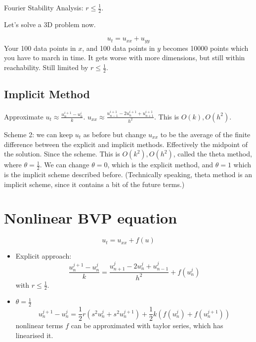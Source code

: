 \documentclass{article}
\numberwithin{equation}{section}
\theoremstyle{definition}
\begin{document}
Fourier Stability Analysis: $r \leq \frac12$.

Let's solve a 3D problem now.

\begin{equation}
    u_t = u_{xx} + u_{yy}
\end{equation}
Your 100 data points in $x$, and 100 data points in $y$ becomes 10000 points which you have to march in time. It gets worse with more dimensions, but still within reachability. Still limited by $r \le \frac 12$.

\subsection{Implicit Method}
Approximate $u_t \approx \frac{u_n^{i+1} - u_n^i}{k}$. $u_{xx} \approx \frac{u_{n-1}^{i+1} - 2u_n^{i+1} + u_{n+1}^{i+1}}{h^2}$. This is $O(k), O(h^2)$.

Scheme 2: we can keep $u_t$ as before but change $u_{xx}$ to be the average of the finite difference between the explicit and implicit methods. Effectively the midpoint of the solution. Since the scheme. This is $O(k^2), O(h^2)$, called the theta method, where $\theta = \frac 12$. We can change $\theta=0$, which is the explicit method, and $\theta = 1$ which is the implicit scheme described before. (Technically speaking, theta method is an implicit scheme, since it contains a bit of the future terms.)

\section{Nonlinear BVP equation}
\begin{equation}
    u_t = u_{xx} + f(u)
\end{equation}
\begin{itemize}
    \item Explicit approach: 
    \begin{equation}
        \frac{u^{j+1}_n - u^j_n}{k} = \frac{u^j_{n+1}-2u^j_n+u^j_{n-1}}{h^2} + f(u^j_n)
    \end{equation}
    with $r \leq \frac 12$.
    \item $\theta = \frac 12$
    \begin{equation}
        u^{j+1}_n - u^j_n = \frac 12 r \left( s^2u^j_n + s^2u^{j+1}_n\right) + \frac 12 k \left(f(u^j_n) + f(u^{j+1}_n)\right)
    \end{equation}
    nonlinear terms $f$ can be approximated with taylor series, which has linearised it.
\end{itemize}
\end{document}
